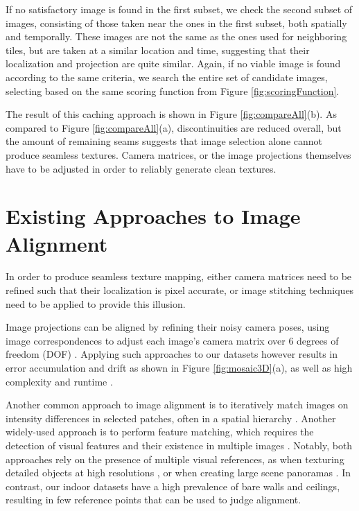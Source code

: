 \documentclass[10pt,twocolumn,letterpaper]{article}
\begin{document}
If no satisfactory image is found in the first subset, we check the
second subset of images, consisting of those taken near the ones in
the first subset, both spatially and temporally. These images are not
the same as the ones used for neighboring tiles, but are taken at a
similar location and time, suggesting that their localization and
projection are quite similar. Again, if no viable image is found
according to the same criteria, we search the entire set of candidate
images, selecting based on the same scoring function from Figure
\ref{fig:scoringFunction}.

The result of this caching approach is shown in Figure
\ref{fig:compareAll}(b). As compared to Figure
\ref{fig:compareAll}(a), discontinuities are reduced overall, but the
amount of remaining seams suggests that image selection alone cannot
produce seamless textures. Camera matrices, or the image projections
themselves have to be adjusted in order to reliably generate clean
textures.

\section{Existing Approaches to Image Alignment}
\label{sec:existingApproaches}
In order to produce seamless texture mapping, either camera matrices
need to be refined such that their localization is pixel accurate, or
image stitching techniques need to be applied to provide this
illusion.

Image projections can be aligned by refining their noisy camera poses,
using image correspondences to adjust each image's camera matrix over
6 degrees of freedom (DOF) \cite{coorg1997matching, liu2010indoor,
  shum2000systems, szeliski1997creating}. Applying such approaches to
our datasets however results in error accumulation and drift as shown
in Figure \ref{fig:mosaic3D}(a), as well as high complexity and
runtime \cite{liu2010indoor}.

Another common approach to image alignment is to
iteratively match images on intensity differences in selected patches,
often in a spatial hierarchy \cite{hager1998efficient,
  lucas1981iterative, shum2000systems, szeliski2006image}. Another
widely-used approach is to perform feature matching, which requires
the detection of visual features and their existence in multiple
images \cite{brown2007automatic, cho2003automatic,
  mikolajczyk2005performance, szeliski2006image,
  yun2003comprehensive}. Notably, both approaches rely on the presence
of multiple visual references, as when texturing detailed objects at
high resolutions \cite{bernardinimultiplescans, wangmultipleviews}, or
when creating large scene panoramas \cite{agarwalapanoramas,
  bernardinimultiplescans, debevecviewdependent,
  snavelyphototourism}. In contrast, our indoor datasets have a high
prevalence of bare walls and ceilings, resulting in few reference
points that can be used to judge alignment.
\end{document}

